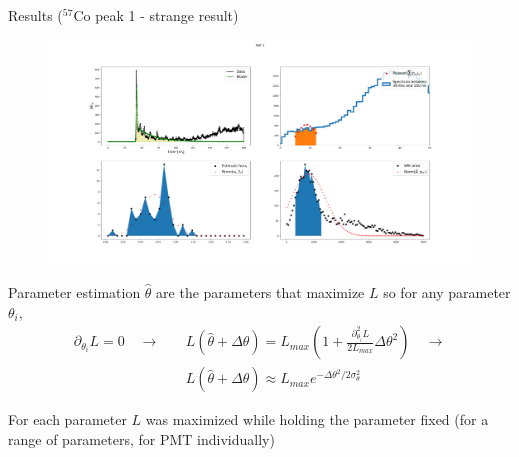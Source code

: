 \documentclass{beamer}
\begin{document}
\begin{frame}{Results ($^{57}$Co peak 1 - strange result)}
\begin{figure}[h]
\includegraphics[width=1\linewidth]{wird.png}
\end{figure}
\end{frame}

\begin{frame}{Parameter estimation}
$\hat{\theta}$ are the parameters that maximize $L$ so for any parameter $\theta_i$, 
\begin{equation}
\begin{split}
\partial_{\theta_i}L=0 \quad \rightarrow\quad &L(\hat{\theta}+\Delta\theta)=L_{max}(1+\frac{\partial^2_{\theta_i}L}{2L_{max}}\Delta\theta^2) \quad
\rightarrow\\
&L(\hat{\theta}+\Delta\theta)\approx L_{max}e^{-\Delta\theta^2/2\sigma^2_{\theta}}
\end{split}
\end{equation}
\end{frame}

\begin{frame}
For each parameter $L$ was maximized while holding the parameter fixed (for a range of parameters, for PMT individually)
\end{frame}
\end{document}
